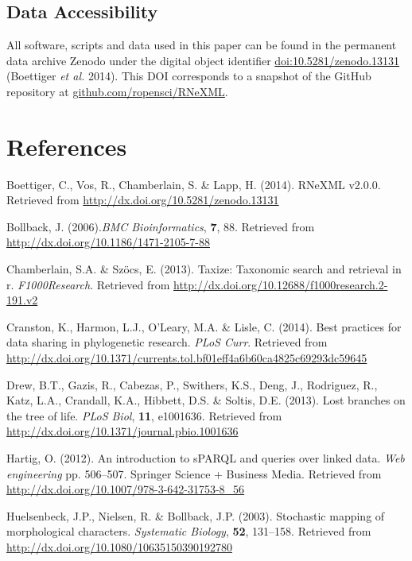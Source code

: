 \documentclass[author-year, review, 11pt]{components/elsarticle} %
\begin{document}
\subsection{Data Accessibility}\label{data-accessibility}

All software, scripts and data used in this paper can be found in the
permanent data archive Zenodo under the digital object identifier
\url{doi:10.5281/zenodo.13131} (Boettiger \emph{et al.} 2014). This DOI
corresponds to a snapshot of the GitHub repository at
\href{https://github.com/ropensci/RNeXML}{github.com/ropensci/RNeXML}.

\section*{References}\label{references}

\hypertarget{refs}{}
\hypertarget{ref-zenodo}{}
Boettiger, C., Vos, R., Chamberlain, S. \& Lapp, H. (2014). RNeXML
v2.0.0. Retrieved from \url{http://dx.doi.org/10.5281/zenodo.13131}

\hypertarget{ref-Bollbackux5f2006}{}
Bollback, J. (2006).\emph{BMC Bioinformatics}, \textbf{7}, 88. Retrieved
from \url{http://dx.doi.org/10.1186/1471-2105-7-88}

\hypertarget{ref-Chamberlainux5f2013}{}
Chamberlain, S.A. \& Szöcs, E. (2013). Taxize: Taxonomic search and
retrieval in r. \emph{F1000Research}. Retrieved from
\url{http://dx.doi.org/10.12688/f1000research.2-191.v2}

\hypertarget{ref-Cranstonux5f2014}{}
Cranston, K., Harmon, L.J., O'Leary, M.A. \& Lisle, C. (2014). Best
practices for data sharing in phylogenetic research. \emph{PLoS Curr}.
Retrieved from
\url{http://dx.doi.org/10.1371/currents.tol.bf01eff4a6b60ca4825c69293dc59645}

\hypertarget{ref-Drewux5f2013}{}
Drew, B.T., Gazis, R., Cabezas, P., Swithers, K.S., Deng, J., Rodriguez,
R., Katz, L.A., Crandall, K.A., Hibbett, D.S. \& Soltis, D.E. (2013).
Lost branches on the tree of life. \emph{PLoS Biol}, \textbf{11},
e1001636. Retrieved from
\url{http://dx.doi.org/10.1371/journal.pbio.1001636}

\hypertarget{ref-Hartigux5f2012}{}
Hartig, O. (2012). An introduction to sPARQL and queries over linked
data. \emph{Web engineering} pp. 506--507. Springer Science + Business
Media. Retrieved from
\url{http://dx.doi.org/10.1007/978-3-642-31753-8_56}

\hypertarget{ref-Huelsenbeckux5f2003}{}
Huelsenbeck, J.P., Nielsen, R. \& Bollback, J.P. (2003). Stochastic
mapping of morphological characters. \emph{Systematic Biology},
\textbf{52}, 131--158. Retrieved from
\url{http://dx.doi.org/10.1080/10635150390192780}
\end{document}
